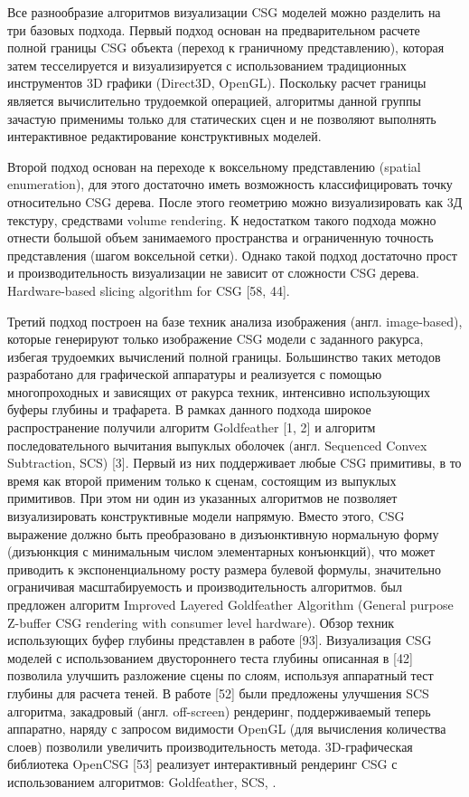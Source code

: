 Все разнообразие алгоритмов визуализации CSG моделей можно разделить на три базовых подхода. Первый подход основан на предварительном расчете полной границы CSG объекта (переход к граничному представлению), которая затем тесселируется и визуализируется с использованием традиционных инструментов 3D графики (Direct3D, OpenGL). Поскольку расчет границы является  вычислительно трудоемкой операцией, алгоритмы данной группы зачастую применимы только для статических сцен и не позволяют выполнять интерактивное редактирование конструктивных моделей.

Второй подход основан на переходе к воксельному представлению (spatial enumeration), для этого достаточно иметь возможность классифицировать точку относительно CSG дерева. После этого геометрию можно визуализировать как 3Д текстуру, средствами volume rendering. К недостатком такого подхода можно отнести большой объем занимаемого пространства и ограниченную точность представления (шагом воксельной сетки). Однако такой подход достаточно прост и производительность визуализации не зависит от сложности CSG дерева. Hardware-based slicing algorithm for CSG [58, 44].

Третий подход построен на базе техник анализа изображения (англ. image-based), которые генерируют только изображение CSG модели с заданного ракурса, избегая трудоемких вычислений полной границы. Большинство таких методов разработано для графической аппаратуры и реализуется с помощью многопроходных и зависящих от ракурса техник, интенсивно использующих буферы глубины и трафарета. В рамках данного подхода широкое распространение получили алгоритм Goldfeather [1, 2] и алгоритм последовательного вычитания выпуклых оболочек (англ. Sequenced Convex Subtraction, SCS) [3]. Первый из них поддерживает любые CSG примитивы, в то время как второй применим только к сценам, состоящим из выпуклых примитивов. При этом ни один из указанных  алгоритмов не позволяет визуализировать конструктивные модели напрямую. Вместо этого, CSG выражение должно быть преобразовано в дизъюнктивную нормальную форму (дизъюнкция с минимальным числом элементарных конъюнкций), что может приводить к экспоненциальному росту размера булевой формулы, значительно ограничивая  масштабируемость и производительность алгоритмов.  был предложен алгоритм Improved Layered Goldfeather Algorithm (General purpose Z-buffer CSG rendering with consumer level hardware). Обзор техник использующих буфер глубины представлен в работе [93]. Визуализация CSG моделей с использованием двустороннего теста глубины описанная в [42] позволила улучшить разложение сцены по слоям, используя аппаратный тест глубины для расчета теней. В работе [52] были предложены улучшения SCS алгоритма, закадровый (англ. off-screen) рендеринг, поддерживаемый теперь аппаратно, наряду с запросом видимости OpenGL (для вычисления количества слоев) позволили увеличить производительность метода. 3D-графическая библиотека OpenCSG [53] реализует интерактивный рендеринг CSG с использованием алгоритмов: Goldfeather, SCS, . 

